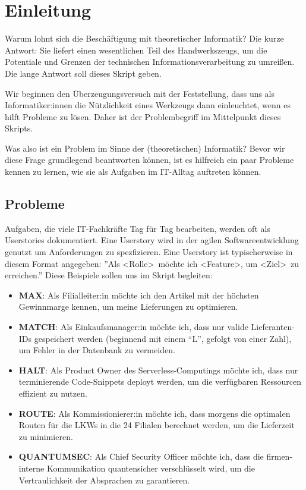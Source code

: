 \chapter{Einleitung}\label{einleitung}
Warum lohnt sich die Beschäftigung mit theoretischer Informatik?
Die kurze Antwort: Sie liefert einen wesentlichen Teil des Handwerkszeugs,
um die Potentiale und Grenzen der technischen Informationsverarbeitung zu umreißen.
Die lange Antwort soll dieses Skript geben.

Wir beginnen den Überzeugungsversuch mit der Feststellung,
dass uns als Informatiker:innen die Nützlichkeit
eines Werkzeugs dann einleuchtet, wenn es hilft Probleme zu lösen.
Daher ist der Problembegriff im Mittelpunkt dieses Skripts.

Was also ist ein Problem im Sinne der (theoretischen) Informatik?
Bevor wir diese Frage grundlegend beantworten können,
ist es hilfreich ein paar Probleme kennen zu lernen,
wie sie als Aufgaben im IT-Alltag auftreten können.

\section{Probleme}
Aufgaben, die viele IT-Fachkräfte Tag für Tag bearbeiten,
werden oft als Userstories dokumentiert.
Eine Userstory wird in der agilen Softwareentwicklung genutzt um Anforderungen zu spezfizieren.
Eine Userstory ist typischerweise in diesem Format angegeben:
''Als \textless Rolle\textgreater\ möchte ich \textless Feature\textgreater,
um \textless Ziel\textgreater\ zu erreichen.''
Diese Beispiele sollen uns im Skript begleiten:

\begin{itemize}
    \item \textbf{MAX}: Als Filialleiter:in möchte ich den Artikel mit der höchsten Gewinnmarge
        kennen, um meine Lieferungen zu optimieren.
    \item \textbf{MATCH}: Als Einkaufsmanager:in möchte ich,
        dass nur valide Lieferanten-IDs gespeichert werden
        (beginnend mit einem ``L'', gefolgt von einer Zahl),
        um Fehler in der Datenbank zu vermeiden.
    \item \textbf{HALT}: Als Product Owner des Serverless-Computings möchte ich,
        dass nur terminierende Code-Snippets deployt werden,
        um die verfügbaren Ressourcen effizient zu nutzen.
    \item \textbf{ROUTE}: Als Kommissionierer:in möchte ich,
        dass morgens die optimalen Routen für die LKWs in die 24 Filialen berechnet werden,
        um die Lieferzeit zu minimieren.
    \item \textbf{QUANTUMSEC}: Als Chief Security Officer möchte ich,
        dass die firmen-interne Kommunikation quantensicher verschlüsselt wird,
        um die Vertraulichkeit der Absprachen zu garantieren.
\end{itemize}

